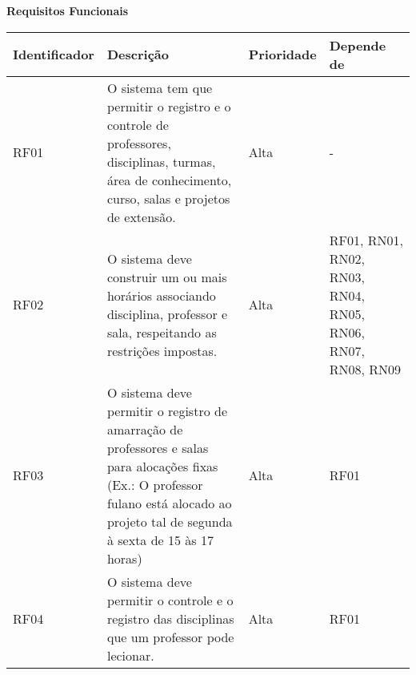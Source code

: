 \documentclass[a4paper, 12pt]{article}
\begin{document}
	
		
	\begin{landscape}
		
		\noindent \textbf{Requisitos Funcionais}
		
		\begin{table}[htp]
			\begin{center}
				\begin{tabular}{|p{3cm}|p{12.5cm}|p{2.5cm}|p{6cm}|}
					\hline
					\textbf{Identificador} & \textbf{Descrição} & \textbf{Prioridade} & \textbf{Depende de} \\
					\hline
					RF01 & O sistema tem que permitir o registro e o controle de professores, disciplinas, turmas, área de conhecimento, curso, salas e projetos de extensão. & Alta & - \\
					\hline
					RF02 & O sistema deve construir um ou mais horários associando disciplina, professor e sala, respeitando as restrições impostas. & Alta & RF01, RN01, RN02, RN03, RN04, RN05, RN06, RN07, RN08, RN09 \\
					\hline
					RF03 & O sistema deve permitir o registro de amarração de professores e salas para alocações fixas (Ex.: O professor fulano está alocado ao projeto tal de segunda à sexta de 15 às 17 horas) & Alta & RF01 \\
					\hline
					RF04 & O sistema deve permitir o controle e o registro das disciplinas que um professor pode lecionar. & Alta & RF01 \\
					\hline
				\end{tabular}
			\end{center}
		\end{table}
	\end{landscape}
	
	
	\newpage
	
\end{document}

